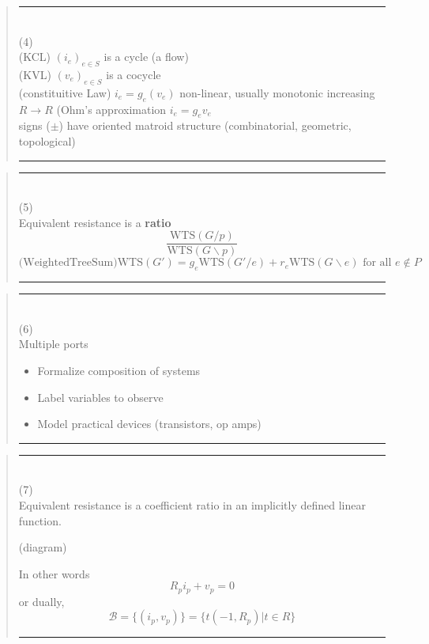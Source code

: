 \documentclass{article}
\begin{document}
\pagebreak[3] \begin{quote}\rule{\textwidth}{3pt}\\
(4)\\
(KCL) $(i_e)_{e\in S}$ is a cycle (a flow)\\
(KVL) $(v_e)_{e\in S}$ is a cocycle\\
(constituitive Law) $i_e=g_e(v_e)$
non-linear, usually monotonic increasing $R\rightarrow R$ 
(Ohm's approximation $i_e=g_ev_e$\\
signs ($\pm$) have oriented matroid structure
(combinatorial, geometric, topological)\\
\rule{\textwidth}{3pt}
\end{quote}

\pagebreak[3] \begin{quote}\rule{\textwidth}{3pt}\\
(5)\\
Equivalent resistance is a \textbf{ratio}
\[
\frac{\mbox{WTS}(G/p)}
{\mbox{WTS}(G\backslash p)}
\]
\[
\mbox{(WeightedTreeSum)}\mbox{WTS}(G') =
g_e \mbox{WTS}(G'/e) + r_e \mbox{WTS} (G \backslash e)
\text{\ for all\ }e \not\in P
\]
\rule{\textwidth}{3pt}
\end{quote}


\pagebreak[3] \begin{quote}\rule{\textwidth}{3pt}\\
(6)\\
Multiple ports

\begin{itemize}
\item
Formalize composition of systems
\item
Label variables to observe
\item
Model practical devices (transistors, op amps)
\end{itemize}

\rule{\textwidth}{3pt}
\end{quote}

\pagebreak[3] \begin{quote}\rule{\textwidth}{3pt}\\
(7)\\
Equivalent resistance is a coefficient ratio in an 
implicitly defined linear function.

(diagram)

In other words
\[
R_pi_p + v_p = 0
\]
or dually,
\[
\mathcal{B} = \{(i_p,v_p)\}
= \{ t(-1, R_p) | t\in R\}
\]

\rule{\textwidth}{3pt}
\end{quote}
\end{document}
